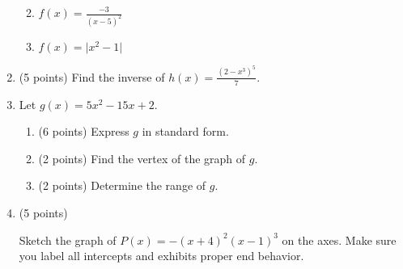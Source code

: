 \documentclass[12pt]{article}
\begin{document}
\begin{enumerate}
\begin{enumerate}
\vfill
\item 
\begin{minipage}[l]{7cm}
$f(x)=\frac{-3}{(x-5)^2}$
\end{minipage}%
\begin{minipage}[c]{10cm}
\end{minipage}
\vfill
\item 
\begin{minipage}[l]{7cm}
$f(x)=\vert x^2-1 \vert$
\end{minipage}%
\begin{minipage}[c]{10cm}
\end{minipage}
\end{enumerate}
\vfill
\newpage
\item (5 points) Find the inverse of $h(x)=\frac{(2-x^3)^5}{7}.$
\vfill
\item Let $g(x)=5x^2-15x +2.$
\begin{enumerate}
\item (6 points) Express $g$ in standard form.
\vfill
\item (2 points) Find the vertex of the graph of $g.$
\vspace{.5in}
\item (2 points) Determine the range of $g.$
\vspace{.5in}
\end{enumerate}
\item (5 points)\\
\begin{minipage}[t]{8cm}
Sketch the graph of $P(x)=-(x+4)^2(x-1)^3$
on the axes. Make sure you label all intercepts and exhibits proper end behavior.
\end{minipage}%
\vspace{-1in}
\begin{flushright}
\begin{tikzpicture}[scale=0.9]

\end{tikzpicture}
\end{flushright}
\end{enumerate}
\end{document}
